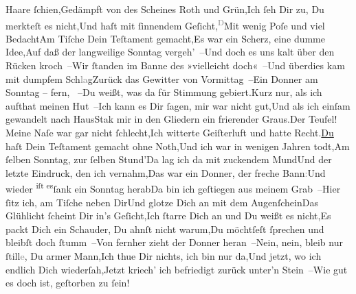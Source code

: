                   Haare{ }ſchien,\newverse{}Gedämpft von des Scheines Roth und Grün,\newverse{}Ich{ }ſeh Dir zu, Du merkteſt es nicht,\newverse{}Und haſt mit{ }ſinnendem Geſicht,\newverse{}\substVorne{}\textsuperscript{\textcolor{gray}{D}}\substDazwischen{}M\substHinten{}it wenig Poſe und viel Bedacht\newverse{}Am Tiſche Dein Teſtament gemacht,\newverse{}Es war ein Scherz, eine dumme Idee,\newverse{}Auf daß der langweilige Sonntag vergeh’ –\newverse{}Und doch es uns kalt über den Rücken kroch –\newverse{}Wir{ }ſtanden im Banne des »vielleicht doch« –\newverse{}Und überdies kam mit dumpfem Sch\textcolor{gray}{la}g\newverse{}Zurück das Gewitter von Vormittag –\newverse{}Ein Donner am Sonntag – fern, \label{K_L02647-2v}\label{K_L02647-2} –\newverse{}Du weißt, was da für Stimmung gebiert.\newverse{}{\pb}Kurz nur, als ich aufthat meinen Hut –\newverse{}Ich kann es Dir{ }ſagen, mir war nicht gut,\newverse{}Und als ich einſam gewandelt nach Haus\newverse{}Stak mir in den Gliedern ein frierender Graus.\newverse{}Der Teufel! Meine Naſe war gar nicht{ }ſchlecht,\newverse{}Ich witterte Geiſterluft und hatte Recht.\newverse{}\uline{Du} haſt Dein Teſtament gemacht ohne Noth,\newverse{}Und ich war in wenigen Jahren todt,\newverse{}Am{ }ſelben Sonntag, zur{ }ſelben Stund’\newverse{}Da lag ich da mit zuckendem Mund\newverse{}Und der letzte Eindruck, den ich vernahm,\newverse{}Das war ein Donner, der freche Bann\textcolor{gray}{:}\newverse{}Und wieder \substVorne{}\textsuperscript{iſt es}\substDazwischen{}ſank\substHinten{} ein Sonntag herab\newverse{}Da bin ich geſtiegen aus meinem Grab –\newverse{}Hier{ }ſitz ich, am Tiſche neben Dir\newverse{}Und glotze Dich an mit dem Augenſchein\newverse{}Das Glühlicht{ }ſcheint Dir in’s Geſicht,\newverse{}Ich{ }ſtarre Dich an und Du weißt es nicht,\newverse{}{\pb}Es packt Dich ein Schauder, Du  ahnſt nicht warum,\newverse{}Du möchtſeſt{ }ſprechen und bleibſt doch{ }ſtumm –\newverse{}Von fernher zieht der Donner heran –\newverse{}Nein, nein, bleib nur{ }ſtill\textcolor{gray}{e}, Du armer Mann,\newverse{}Ich thue Dir nichts, ich bin nur da,\newverse{}Und jetzt, wo ich endlich Dich wiederſah,\newverse{}Jetzt kriech’ ich befriedigt zurück unter’n Stein –\newverse{}Wie gut es doch ist, geſtorben zu{ }ſein!\stanzaend{}\endnumbering{}  \newcommand{\dateiname}{L02647}\newcommand{\titel}{Paul Goldmann an Arthur Schnitzler, [27. 4. 1890]}\newcommand{\editorInnen}{Martin Anton Müller und Laura Untner}
